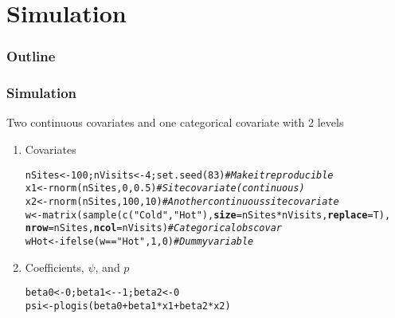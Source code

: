 \documentclass[color=usenames,dvipsnames]{beamer}\usepackage[]{graphicx}\usepackage[]{xcolor}
\makeatletter
\newcommand{\hlnum}[1]{\textcolor[rgb]{0.69,0.494,0}{#1}}%
\newcommand{\hlsng}[1]{\textcolor[rgb]{0.749,0.012,0.012}{#1}}%
\newcommand{\hlcom}[1]{\textcolor[rgb]{0.514,0.506,0.514}{\textit{#1}}}%
\newcommand{\hlopt}[1]{\textcolor[rgb]{0,0,0}{#1}}%
\newcommand{\hldef}[1]{\textcolor[rgb]{0,0,0}{#1}}%
\newcommand{\hlkwb}[1]{\textcolor[rgb]{0,0.341,0.682}{#1}}%
\newcommand{\hlkwc}[1]{\textcolor[rgb]{0,0,0}{\textbf{#1}}}%
\newcommand{\hlkwd}[1]{\textcolor[rgb]{0.004,0.004,0.506}{#1}}%
\newenvironment{kframe}{%
 \def\at@end@of@kframe{}%
 \ifinner\ifhmode%
  \def\at@end@of@kframe{\end{minipage}}%
  \begin{minipage}{\columnwidth}%
 \fi\fi%
 \def\FrameCommand##1{\hskip\@totalleftmargin \hskip-\fboxsep
 \colorbox{shadecolor}{##1}\hskip-\fboxsep
     \hskip-\linewidth \hskip-\@totalleftmargin \hskip\columnwidth}%
 \MakeFramed {\advance\hsize-\width
   \@totalleftmargin\z@ \linewidth\hsize
   \@setminipage}}%
 {\par\unskip\endMakeFramed%
 \at@end@of@kframe}
\newenvironment{knitrout}{}{} %
\makeatother
\begin{document}
\section{Simulation}



\begin{frame}
  \frametitle{Outline}
  \Large
  \tableofcontents[currentsection]
\end{frame}


\begin{frame}[fragile]
  \frametitle{Simulation}
  \small
  Two continuous covariates and one categorical covariate with 2 levels
  \vfill
  \begin{enumerate}[<+->]
  \item Covariates
\begin{knitrout}\scriptsize
{}\color{fgcolor}\begin{kframe}
\begin{alltt}
\hldef{nSites} \hlkwb{<-} \hlnum{100}\hldef{; nVisits} \hlkwb{<-} \hlnum{4}\hldef{;} \hlkwd{set.seed}\hldef{(}\hlnum{83}\hldef{)} \hlcom{# Make it reproducible}
\hldef{x1} \hlkwb{<-} \hlkwd{rnorm}\hldef{(nSites,}\hlnum{0}\hldef{,}\hlnum{0.5}\hldef{)}  \hlcom{# Site covariate (continuous)}
\hldef{x2} \hlkwb{<-} \hlkwd{rnorm}\hldef{(nSites,}\hlnum{100}\hldef{,}\hlnum{10}\hldef{)} \hlcom{# Another continuous site covariate}
\hldef{w} \hlkwb{<-} \hlkwd{matrix}\hldef{(}\hlkwd{sample}\hldef{(}\hlkwd{c}\hldef{(}\hlsng{"Cold"}\hldef{,} \hlsng{"Hot"}\hldef{),} \hlkwc{size}\hldef{=nSites}\hlopt{*}\hldef{nVisits,} \hlkwc{replace}\hldef{=T),}
            \hlkwc{nrow}\hldef{=nSites,} \hlkwc{ncol}\hldef{=nVisits)} \hlcom{# Categorical obs covar}
\hldef{wHot} \hlkwb{<-} \hlkwd{ifelse}\hldef{(w}\hlopt{==}\hlsng{"Hot"}\hldef{,} \hlnum{1}\hldef{,} \hlnum{0}\hldef{)}         \hlcom{# Dummy variable}
\end{alltt}
\end{kframe}
\end{knitrout}
  \item Coefficients, $\psi$, and $p$
\begin{knitrout}\scriptsize
{}\color{fgcolor}\begin{kframe}
\begin{alltt}
\hldef{beta0} \hlkwb{<-} \hlnum{0}\hldef{; beta1} \hlkwb{<-} \hlopt{-}\hlnum{1}\hldef{; beta2} \hlkwb{<-} \hlnum{0}
\hldef{psi} \hlkwb{<-} \hlkwd{plogis}\hldef{(beta0} \hlopt{+} \hldef{beta1}\hlopt{*}\hldef{x1} \hlopt{+} \hldef{beta2}\hlopt{*}\hldef{x2)}

\end{alltt}
\end{kframe}
\end{knitrout}
\end{enumerate}
\end{frame}
\end{document}
